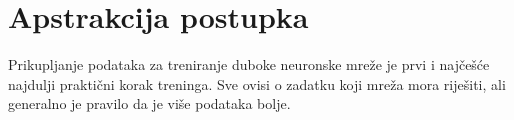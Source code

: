 \section{Apstrakcija postupka}
Prikupljanje podataka za treniranje duboke neuronske mreže je prvi i najčešće najdulji praktični korak treninga. Sve ovisi o zadatku koji mreža mora riješiti, ali generalno je pravilo da je više podataka bolje.
